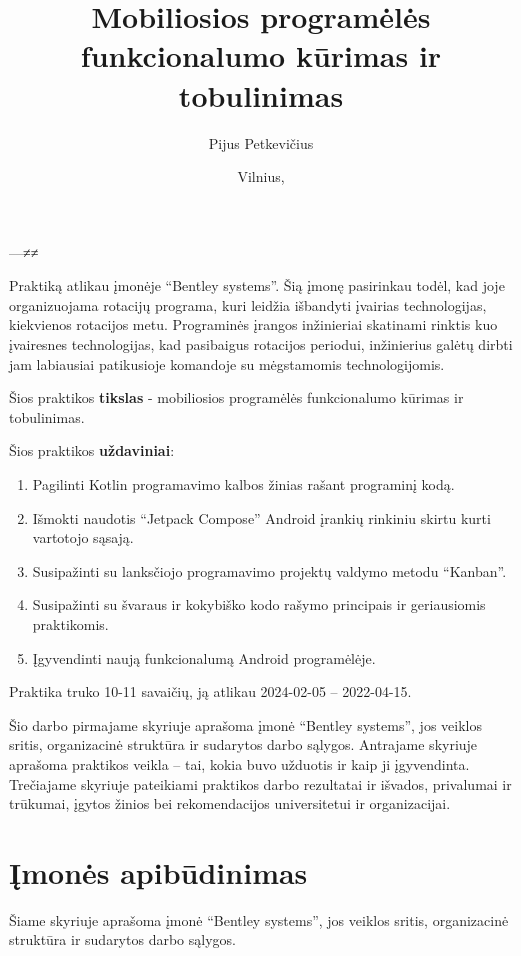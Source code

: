 \documentclass{VUMIFPSPraktika}
\author{Pijus Petkevičius}
\title{Mobiliosios programėlės funkcionalumo kūrimas ir tobulinimas}
\date{Vilnius, \the\year}
\begin{document}
\maketitle––≠≠
\tableofcontents

Praktiką atlikau įmonėje \enquote{Bentley systems}. Šią įmonę pasirinkau todėl, kad joje organizuojama rotacijų programa, kuri leidžia išbandyti įvairias technologijas, kiekvienos rotacijos metu. Programinės įrangos inžinieriai skatinami rinktis kuo įvairesnes technologijas, kad pasibaigus rotacijos periodui, inžinierius galėtų dirbti jam labiausiai patikusioje komandoje su mėgstamomis technologijomis.
\bigskip

Šios praktikos \textbf{tikslas} - mobiliosios programėlės funkcionalumo kūrimas ir tobulinimas.
\bigskip

Šios praktikos \textbf{uždaviniai}:
\begin{enumerate}
    \item Pagilinti Kotlin programavimo kalbos žinias rašant programinį kodą.
    \item Išmokti naudotis “Jetpack Compose” Android įrankių rinkiniu skirtu kurti vartotojo sąsają.
    \item Susipažinti su lanksčiojo programavimo projektų valdymo metodu “Kanban”.
    \item Susipažinti su švaraus ir kokybiško kodo rašymo principais ir geriausiomis praktikomis. 
    \item Įgyvendinti naują funkcionalumą Android programėlėje.
\end{enumerate}
\bigskip

Praktika truko 10-11 savaičių, ją atlikau 2024-02-05 -- 2022-04-15.

Šio darbo pirmajame skyriuje aprašoma įmonė \enquote{Bentley systems}, jos veiklos sritis, organizacinė struktūra ir sudarytos darbo sąlygos. Antrajame skyriuje aprašoma praktikos veikla -- tai, kokia buvo užduotis ir kaip ji įgyvendinta. Trečiajame skyriuje pateikiami praktikos darbo rezultatai ir išvados, privalumai ir trūkumai, įgytos žinios bei rekomendacijos universitetui ir organizacijai.

\section{Įmonės apibūdinimas}
Šiame skyriuje aprašoma įmonė \enquote{Bentley systems}, jos veiklos sritis, organizacinė struktūra ir sudarytos darbo sąlygos.
\end{document}
